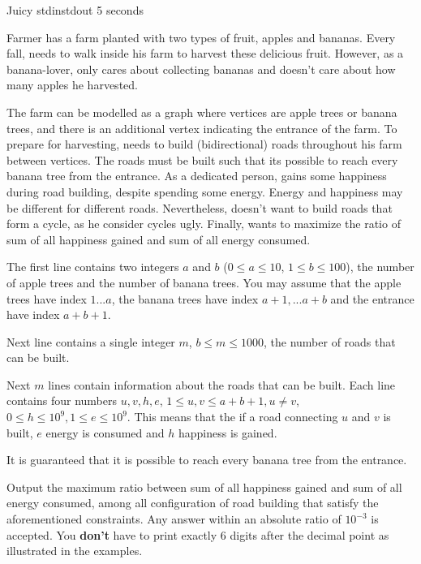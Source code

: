 \begin{problem}{Juicy}
{stdin}{stdout}
{5 seconds}{}{}

Farmer \pittoresque has a farm planted with two types of fruit, apples and bananas. Every fall, \pittoresque needs to walk inside his farm to harvest these delicious fruit. However, as a banana-lover, \pittoresque only cares about collecting bananas and doesn't care about how many apples he harvested. 

The farm can be modelled as a graph where vertices are apple trees or banana trees, and there is an additional vertex indicating the entrance of the farm. To prepare for harvesting, \pittoresque needs to build (bidirectional) roads throughout his farm between vertices. The roads must be built such that its possible to reach every banana tree from the entrance. As a dedicated person, \pittoresque gains some happiness during road building, despite spending some energy. Energy and happiness may be different for different roads. Nevertheless, \pittoresque doesn't want to build roads that form a cycle, as he consider cycles ugly. Finally, \pittoresque wants to maximize the ratio of sum of all happiness gained and sum of all energy consumed.

\InputFile

The first line contains two integers $a$ and $b$ ($0 \le a \le 10$, $1 \le b \le 100$), the number of apple trees and the number of banana trees. You may assume that the apple trees have index $1 ... a$, the banana trees have index $a + 1, ... a + b$ and the entrance have index $a + b + 1$.

Next line contains a single integer $m$, $b \leq m \leq 1000$, the number of roads that can be built.

Next $m$ lines contain information about the roads that can be built. Each line contains four numbers $u, v, h, e$, $1 \le u, v \le a + b + 1, u \neq v$, $0 \le h \le 10^9, 1 \le e \le 10^9$. This means that the if a road connecting $u$ and $v$ is built, $e$ energy is consumed and $h$ happiness is gained.

It is guaranteed that it is possible to reach every banana tree from the entrance.

\OutputFile

Output the maximum ratio between sum of all happiness gained and sum of all energy consumed, among all configuration of road building that satisfy the aforementioned constraints. Any answer within an absolute ratio of $10^{-3}$ is accepted. You \textbf{don't} have to print exactly 6 digits after the decimal point as illustrated in the examples.

\Examples

\begin{example}
%
\end{example}

\begin{example}
%
\end{example}



\end{problem}